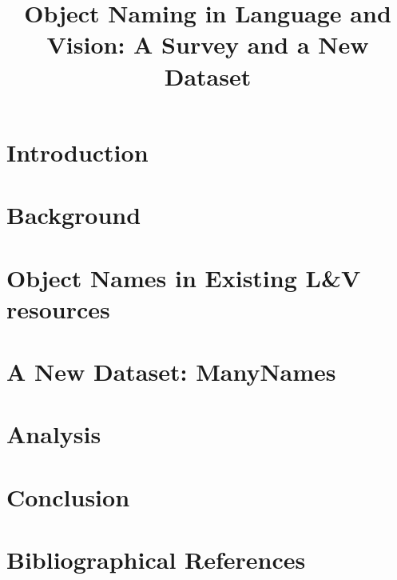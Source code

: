 \documentclass[10pt, a4paper]{article}
\title{Object Naming in Language and Vision: A Survey and a New Dataset}
\begin{document}
\maketitleabstract


\section{Introduction}


\section{Background}
\label{sec:rel-work}


\section{Object Names in Existing L\&V resources}
\label{sec:survey}


\section{A New Dataset: ManyNames}
\label{sec:data}

	
\section{Analysis}
\label{sec:analysis}


\section{Conclusion}
\label{sec:conc}




\section{Bibliographical References}
\label{main:ref}





\end{document}
